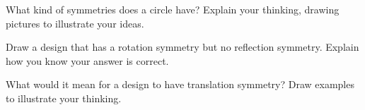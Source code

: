 \documentclass[nooutcomes, noauthor, handout]{ximera}
\begin{document}
\begin{problem}
What kind of symmetries does a circle have? Explain your thinking, drawing pictures to illustrate your ideas.
\end{problem}



\begin{problem}
Draw a design that has a rotation symmetry but no reflection symmetry. Explain how you know your answer is correct.
\end{problem}


\begin{problem}
What would it mean for a design to have translation symmetry? Draw examples to illustrate your thinking.
\end{problem}
\end{document}
